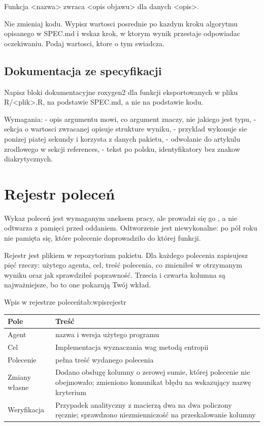 \begin{zapis}
Funkcja <nazwa> zwraca <opis objawu> dla danych <opis>.

Nie zmieniaj kodu. Wypisz wartosci posrednie po kazdym kroku algorytmu
opisanego w SPEC.md i wskaz krok, w ktorym wynik przestaje odpowiadac
oczekiwaniu. Podaj wartosci, ktore o tym swiadcza.
\end{zapis}

\subsection{Dokumentacja ze specyfikacji}

\begin{zapis}
Napisz bloki dokumentacyjne roxygen2 dla funkcji eksportowanych w pliku
R/<plik>.R, na podstawie SPEC.md, a nie na podstawie kodu.

Wymagania:
- opis argumentu mowi, co argument znaczy, nie jakiego jest typu,
- sekcja o wartosci zwracanej opisuje strukture wyniku,
- przyklad wykonuje sie ponizej piatej sekundy i korzysta z danych pakietu,
- odwolanie do artykulu zrodlowego w sekcji references,
- tekst po polsku, identyfikatory bez znakow diakrytycznych.
\end{zapis}

\section{Rejestr poleceń}\label{sec:rejestr}

Wykaz poleceń jest wymaganym aneksem pracy, ale prowadzi się go , a nie odtwarza z pamięci przed oddaniem. Odtworzenie jest niewykonalne: po pół roku nie pamięta się, które polecenie doprowadziło do której funkcji.

Rejestr jest plikiem w repozytorium pakietu. Dla każdego polecenia zapisujesz pięć rzeczy: użytego agenta, cel, treść polecenia, co zmieniłeś w otrzymanym wyniku oraz jak sprawdziłeś poprawność. Trzecia i czwarta kolumna są najważniejsze, bo to one pokazują Twój wkład.

\begin{tabelaepi}{Wpis w rejestrze poleceń}{tab:wpisrejestr}
\begin{tabular}{@{}p{2.8cm}p{10.4cm}@{}}
\toprule
Pole & Treść \\
\midrule
Agent & nazwa i wersja użytego programu \\
Cel & Implementacja wyznaczania wag metodą entropii \\
Polecenie & pełna treść wydanego polecenia \\
Zmiany własne & Dodano obsługę kolumny o zerowej sumie, której polecenie nie obejmowało; zmieniono komunikat błędu na wskazujący nazwę kryterium \\
Weryfikacja & Przypadek analityczny z macierzą dwa na dwa policzony ręcznie; sprawdzono niezmienniczość na przeskalowanie kolumny \\
\bottomrule
\end{tabular}
\end{tabelaepi}

